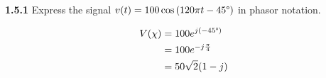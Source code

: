 \documentclass{article}
\begin{document}
\textbf{1.5.1} Express the signal $v(t) = 100\cos{(120\pi t - 45\degree)}$ in phasor notation.

\begin{equation*}
	\begin{split}
		V(\chi) & = 100e^{j(-45\degree)} \\
		& = 100e^{-j\frac{\pi}{4}} \\
		& = 50\sqrt{2}(1 - j)
	\end{split}
\end{equation*}
\end{document}
